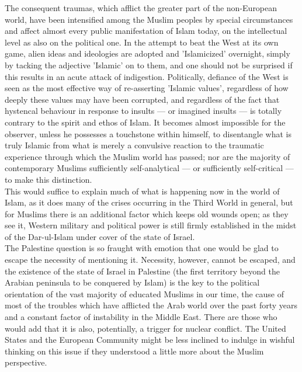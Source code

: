 \documentclass[11pt, b5paper, twoside]{book}
\begin{document}
The consequent traumas, which afflict the greater part of the non\hyp{}European world, have been intensified among the Muslim peoples by special circumstances and affect almost every public manifestation of Islam today, on the intellectual level as also on the political one. In the attempt to beat the West at its own game, alien ideas and ideologies are adopted and 'Islamicized' overnight, simply by tacking the adjective 'Islamic' on to them, and one should not be surprised if this results in an acute attack of indigestion. Politically, defiance of the West is seen as the most effective way of re-asserting 'Islamic values', regardless of how deeply these values may have been corrupted, and regardless of the fact that hystencal behaviour in response to insults --- or imagined insults --- is totally contrary to the spirit and ethos of Islam. It becomes almost impossible for the observer, unless he possesses a touchstone within himself, to disentangle what is truly Islamic from what is merely a convulsive reaction to the traumatic experience through which the Muslim world has passed; nor are the majority of contemporary Muslims sufficiently self-analytical --- or sufficiently self-critical --- to make this distinction. \\

This would suffice to explain much of what is happening now in the world of Islam, as it does many of the crises occurring in the Third World in general, but for Muslims there is an additional factor which keeps old wounds open; as they see it, Western military and political power is still firmly established in the midst of the Dar-ul-Islam under cover of the state of Israel. \\

The Palestine question is so fraught with emotion that one would be glad to escape the necessity of mentioning it. Necessity, however, cannot be escaped, and the existence of the state of Israel in Palestine (the first territory beyond the Arabian peninsula to be conquered by Islam) is the key to the political orientation of the vast majority of educated Muslims in our time, the cause of most of the troubles which have afflicted the Arab world over the past forty years and a constant factor of instability in the Middle East. There are those who would add that it is also, potentially, a trigger for nuclear conflict. The United States and the European Community might be less inclined to indulge in wishful thinking on this issue if they understood a little more about the Muslim perspective. \\
\end{document}
